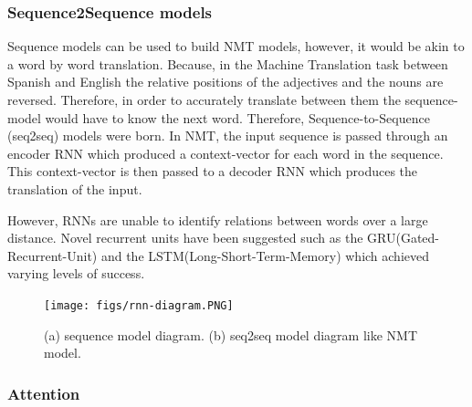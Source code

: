 \documentclass[12pt,a4paper,twoside,openright]{report}
\begin{document}
\subsubsection{Sequence2Sequence models}
Sequence models can be used to build NMT models, however, it would be akin to a word by word translation. Because, in the Machine Translation task between Spanish and English the relative positions of the adjectives and the nouns are reversed. Therefore, in order to accurately translate between them the sequence-model would have to know the next word. Therefore, Sequence-to-Sequence (seq2seq) models\cite{seq2seq} were born.
In NMT, the input sequence is passed through an encoder RNN which produced a context-vector for each word in the sequence. This context-vector is then passed to a decoder RNN which produces the translation of the input.

However, RNNs are unable to identify relations between words over a large distance. Novel recurrent units have been suggested such as the GRU(Gated-Recurrent-Unit) and the LSTM(Long-Short-Term-Memory) which achieved varying levels of success.

\begin{figure}
    \centering
    \texttt{[image: figs/rnn-diagram.PNG]}
    \caption{(a) sequence model diagram. (b) seq2seq model diagram like NMT model.}
    \label{fig:rnn-diagram}
\end{figure}

\subsubsection{Attention}
\end{document}
